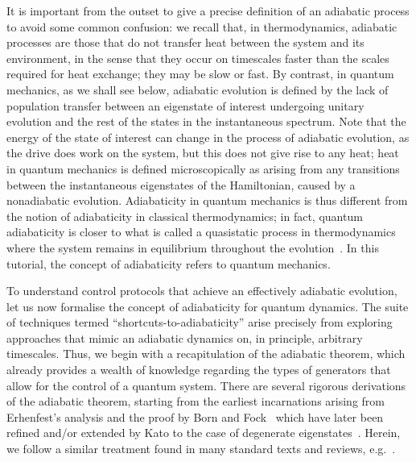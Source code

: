 It is important from the outset to give a precise definition of an adiabatic process to avoid some common confusion: we recall that, in thermodynamics, adiabatic processes are those that do not transfer heat between the system and its environment, in the sense that they occur on timescales faster than the scales required for heat exchange; they may be slow or fast. By contrast, in quantum mechanics, as we shall see below, adiabatic evolution is defined by the lack of population transfer between an eigenstate of interest undergoing unitary evolution and the rest of the states in the instantaneous spectrum. Note that the energy of the state of interest can change in the process of adiabatic evolution, as the drive does work on the system, but this does not give rise to any heat; heat in quantum mechanics is defined microscopically as arising from any transitions between the instantaneous eigenstates of the Hamiltonian, caused by a nonadiabatic evolution. Adiabaticity in quantum mechanics is thus different from the notion of adiabaticity in classical thermodynamics; in fact, quantum adiabaticity is closer to what is called a quasistatic process in thermodynamics where the system remains in equilibrium throughout the evolution~\cite{dalessio2016quantum}. In this tutorial, the concept of adiabaticity refers to quantum mechanics.

To understand control protocols that achieve an effectively adiabatic evolution, let us now formalise the concept of adiabaticity for quantum dynamics. The suite of techniques termed ``shortcuts-to-adiabaticity'' arise precisely from exploring approaches that mimic an adiabatic dynamics on, in principle, arbitrary timescales. Thus, we begin with a recapitulation of the adiabatic theorem, which already provides a wealth of knowledge regarding the types of generators that allow for the control of a quantum system. There are several rigorous derivations of the adiabatic theorem, starting from the earliest incarnations arising from Erhenfest's analysis and the proof by Born and Fock~\cite{Born1928} which have later been refined and/or extended by Kato to the case of degenerate eigenstates~\cite{Kato1950}. Herein, we follow a similar treatment found in many standard texts and reviews, e.g.~\cite{BudichReview}.

